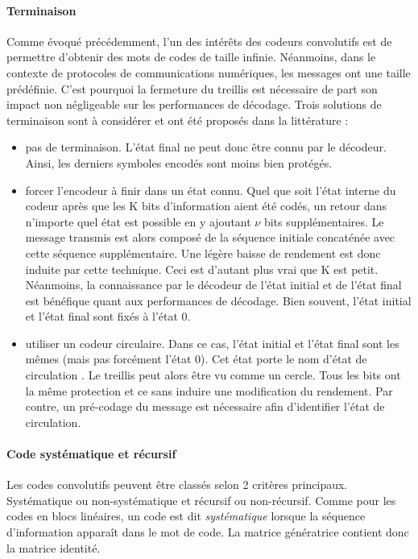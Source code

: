 \paragraph*{Terminaison}\label{par:term}
Comme évoqué précédemment, l'un des intérêts des codeurs convolutifs est de permettre d'obtenir des mots de codes de 
taille infinie. Néanmoins, dans le contexte de protocoles de communications numériques, les messages ont une taille 
prédéfinie. C'est pourquoi la fermeture du treillis est nécessaire de part son impact non négligeable sur les performances de 
décodage. Trois solutions de terminaison sont à considérer et ont été proposés dans la littérature :
\begin{itemize}
	\item pas de terminaison. L'état final ne peut donc être connu par le décodeur. Ainsi, les derniers symboles encodés
	      sont moins bien protégés. 
	\item forcer l'encodeur à finir dans un état connu. 
	      Quel que soit l'état interne du codeur après que les K bits d'information aient été codés, un retour dans n'importe quel état est possible en y ajoutant $\nu$ bits supplémentaires. Le message transmis est alors composé de la séquence initiale concaténée avec cette séquence supplémentaire.
	      Une légère baisse de rendement est donc induite par cette technique. 
	      Ceci est d'autant plus vrai que K est petit. 
	      Néanmoins, la connaissance par le décodeur de l'état initial et de l'état final est bénéfique quant aux performances de décodage. Bien souvent, l'état initial et l'état final sont fixés à l'état 0.
	\item utiliser un codeur circulaire. Dans ce cas, l'état initial et l'état final sont les mêmes (mais pas forcément 
	      l'état 0). Cet état porte le nom d'état de circulation \cite{circular}. Le treillis peut alors être vu comme un 
	      cercle. Tous les bits ont la même protection et ce sans induire une modification du rendement. Par contre, 
	      un pré-codage du message est nécessaire afin d'identifier l'état de circulation.
\end{itemize}

\paragraph*{Code systématique et récursif}
Les codes convolutifs peuvent être classés selon 2 critères principaux. Systématique ou non-systématique et récursif ou
non-récursif. 
Comme pour les codes en blocs linéaires, un code est dit \emph{systématique} lorsque la séquence 
d'information apparaît dans le mot de code. La matrice génératrice contient donc la matrice identité. 

